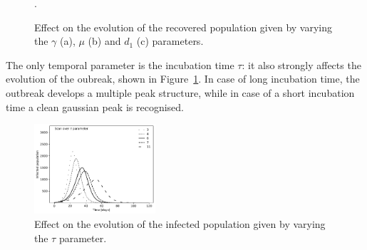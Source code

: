 \begin{figure}[!ht]\centering
{}
\caption{Effect on the evolution of the recovered population given by varying the $\gamma$ (a), $\mu$ (b) and $d_1$ (c) parameters.}.
\end{figure}

The only temporal parameter is the incubation time $\tau$: it also strongly affects the evolution of the oubreak, shown in Figure~\ref{fig:scan_i_vs_tau}. In case of long incubation time, the outbreak develops a  multiple peak structure, while in case of a short incubation time a clean gaussian peak is recognised.

\begin{figure}[!ht]\centering
\includegraphics[width=0.4\textwidth]{imgs/ModelDescription/Scan_I_vs_tau_parameters_alternative.pdf}
\caption{Effect on the evolution of the infected population given by varying the $\tau$ parameter.}
\label{fig:scan_i_vs_tau}
\end{figure}

